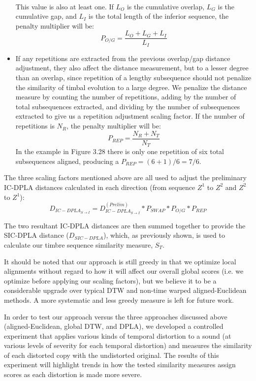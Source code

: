 \documentclass[a4paper,12pt]{report} 	%
\numberwithin{figure}{chapter}
\numberwithin{table}{chapter}
\numberwithin{equation}{chapter}
\begin{document}
\begin{flushleft}
\begin{itemize}
\begin{figure}[h!]
\begin{center}
\end{center}
\end{figure}
\\
This value is also at least one. If $L_O$ is the cumulative overlap, $L_G$ is the cumulative gap, and $L_I$ is the total length of the inferior sequence, the penalty multiplier will be:
\begin{equation}
P_{O/G} = \frac{L_O+L_G+L_I}{L_I}
\end{equation}
\item If any repetitions are extracted from the previous overlap/gap distance adjustment, they also affect the distance measurement, but to a lesser degree than an overlap, since repetition of a lengthy subsequence should not penalize the similarity of timbal evolution to a large degree. We penalize the distance measure by counting the number of repetitions, adding by the number of total subsequences extracted, and dividing by the number of subsequences extracted to give us a repetition adjustment scaling factor. If the number of repetitions is $N_R$, the penalty multiplier will be:
\begin{equation}
P_{REP} = \frac{N_R+N_T}{N_T}
\end{equation}
In the example in Figure 3.28 there is only one repetition of six total subsequences aligned, producing a $P_{REP}=(6+1)/6=7/6$.
\end{itemize}
The three scaling factors mentioned above are all used to adjust the preliminary IC-DPLA distances calculated in each direction (from sequence $Z^1$ to $Z^2$ and $Z^2$ to $Z^1$):
\begin{equation}
D_{IC-DPLA_{S \to I}} = D_{IC-DPLA_{S \to I}}^{(Prelim)} * P_{SWAP} * P_{O/G} * P_{REP}
\end{equation}

The two resultant IC-DPLA distances are then summed together to provide the SIC-DPLA distance ($D_{SIC-DPLA}$), which, as previously shown, is used to calculate our timbre sequence similarity measure, $S_T$.

It should be noted that our approach is still greedy in that we optimize local alignments without regard to how it will affect our overall global scores (i.e. we optimize before applying our scaling factors), but we believe it to be a considerable upgrade over typical DTW and non-time warped aligned-Euclidean methods. A more systematic and less greedy measure is left for future work.

In order to test our approach versus the three approaches discussed above (aligned-Euclidean, global DTW, and DPLA), we developed a controlled experiment that applies various kinds of temporal distortion to a sound (at various levels of severity for each temporal distortion) and measures the similarity of each distorted copy with the undistorted original. The results of this experiment will highlight trends in how the tested similarity measures assign scores as each distortion is made more severe.


\end{flushleft}
\end{document}
